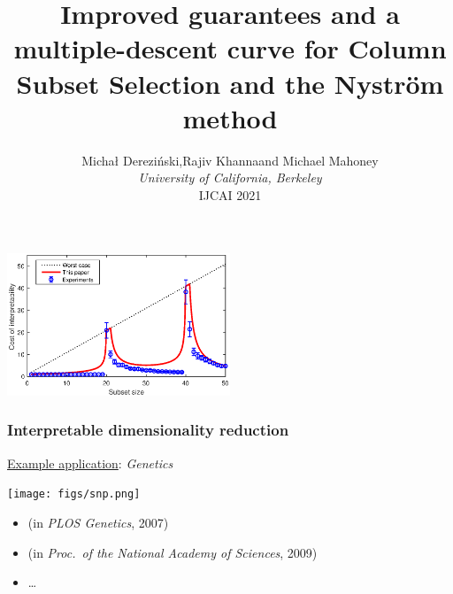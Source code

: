 \documentclass{beamer}
\title[]{\large\textrm{Improved guarantees and a multiple-descent curve
for Column Subset Selection and the Nystr\"om method}}
\author[]{Micha{\l} Derezi\'{n}ski,\quad Rajiv Khanna\quad and\quad
  Michael Mahoney\\[2mm]
  \small\textit{University of California, Berkeley}\\[2mm]
IJCAI 2021}
\begin{document}
\begin{frame}
  \titlepage
  \vspace{-20mm}
  
  \centering\includegraphics[width=0.5\textwidth]{figs/nystrom-bounds-press}
  \let\thefootnote\relax{}
\end{frame}

\linespread{1.3}

\begin{frame}
  \frametitle{Interpretable dimensionality reduction}
  \onslide<+->
  \underline{Example application}: \textit{Genetics}
  \begin{center}
    \texttt{[image: figs/snp.png]}
  \end{center}


  \begin{itemize}
  \item   \cite{paschou2007pca} (in \textit{PLOS Genetics}, 2007) \\[-1mm]
\vspace{2mm}

  \item   \cite{mahoney2009cur} (in \textit{Proc.~of the National Academy of
    Sciences}, 2009)\\[-1mm]
    \item   \dots
  \end{itemize}
\end{frame}
\end{document}

